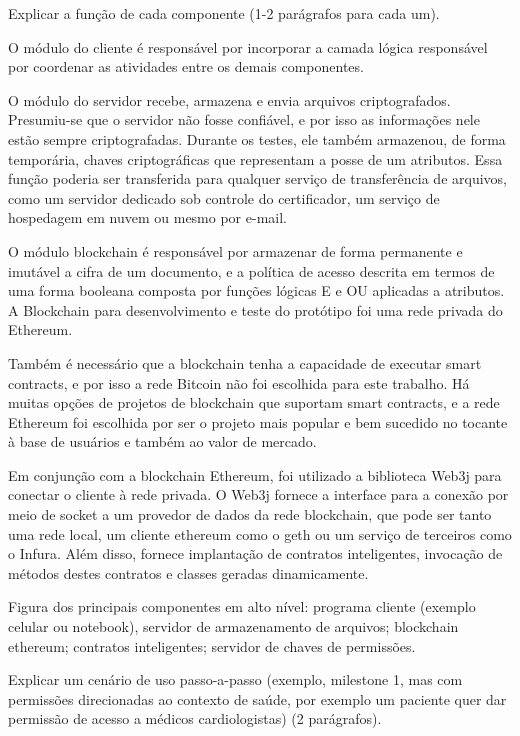 \documentclass[a4paper,11pt]{article}
\begin{document}
{\color{ForestGreen}Explicar a função de cada componente (1-2 parágrafos para cada um).}

O módulo do cliente é responsável por incorporar a camada lógica responsável por coordenar as atividades entre os demais componentes.

O módulo do servidor recebe, armazena e envia arquivos criptografados. Presumiu-se que o servidor não fosse confiável, e por isso as informações nele estão sempre criptografadas. Durante os testes, ele também armazenou, de forma temporária, chaves criptográficas que representam a posse de um atributos. Essa função poderia ser transferida para qualquer serviço de transferência de arquivos, como um servidor dedicado sob controle do certificador, um serviço de hospedagem em nuvem ou mesmo por e-mail.

O módulo blockchain é responsável por armazenar de forma permanente e imutável a cifra de um documento, e a política de acesso descrita em termos de uma forma booleana composta por funções lógicas E e OU aplicadas a atributos. A Blockchain para desenvolvimento e teste do protótipo foi uma rede privada do Ethereum.

Também é necessário que a blockchain tenha a capacidade de executar smart contracts, e por isso a rede Bitcoin não foi escolhida para este trabalho. Há muitas opções de projetos de blockchain que suportam smart contracts, e a rede Ethereum foi escolhida por ser o projeto mais popular e bem sucedido no tocante à base de usuários e também ao valor de mercado.

Em conjunção com a blockchain Ethereum, foi utilizado a biblioteca Web3j para conectar o cliente à rede privada. O Web3j fornece a interface para a conexão por meio de socket a um provedor de dados da rede blockchain, que pode ser tanto uma rede local, um cliente ethereum como o geth ou um serviço de terceiros como o Infura. Além disso, fornece implantação de contratos inteligentes, invocação de métodos destes contratos e classes geradas dinamicamente.

{\color{ForestGreen}Figura dos principais componentes em alto nível: programa cliente (exemplo celular ou notebook), servidor de armazenamento de arquivos; blockchain ethereum; contratos inteligentes; servidor de chaves de permissões.}

{\color{ForestGreen}Explicar um cenário de uso passo-a-passo (exemplo, milestone 1, mas com permissões direcionadas ao contexto de saúde, por exemplo um paciente quer dar permissão de acesso a médicos cardiologistas) (2 parágrafos)}.
\end{document}
